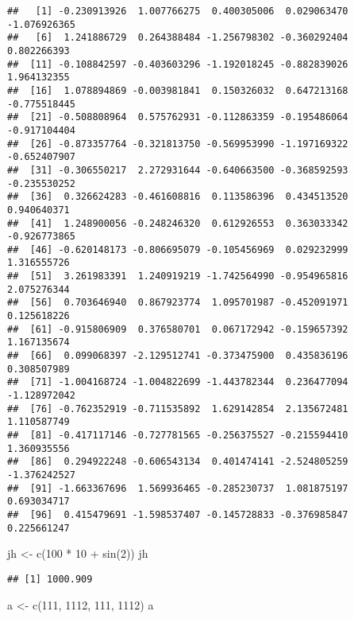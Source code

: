 \documentclass[
]{article}
\newenvironment{Shaded}{\begin{snugshade}}{\end{snugshade}}
\newcommand{\DecValTok}[1]{\textcolor[rgb]{0.00,0.00,0.81}{#1}}
\newcommand{\FunctionTok}[1]{\textcolor[rgb]{0.00,0.00,0.00}{#1}}
\newcommand{\NormalTok}[1]{#1}
\newcommand{\OtherTok}[1]{\textcolor[rgb]{0.56,0.35,0.01}{#1}}
\newcommand{\SpecialCharTok}[1]{\textcolor[rgb]{0.00,0.00,0.00}{#1}}
\begin{document}
\begin{verbatim}
##   [1] -0.230913926  1.007766275  0.400305006  0.029063470 -1.076926365
##   [6]  1.241886729  0.264388484 -1.256798302 -0.360292404  0.802266393
##  [11] -0.108842597 -0.403603296 -1.192018245 -0.882839026  1.964132355
##  [16]  1.078894869 -0.003981841  0.150326032  0.647213168 -0.775518445
##  [21] -0.508808964  0.575762931 -0.112863359 -0.195486064 -0.917104404
##  [26] -0.873357764 -0.321813750 -0.569953990 -1.197169322 -0.652407907
##  [31] -0.306550217  2.272931644 -0.640663500 -0.368592593 -0.235530252
##  [36]  0.326624283 -0.461608816  0.113586396  0.434513520  0.940640371
##  [41]  1.248900056 -0.248246320  0.612926553  0.363033342 -0.926773865
##  [46] -0.620148173 -0.806695079 -0.105456969  0.029232999  1.316555726
##  [51]  3.261983391  1.240919219 -1.742564990 -0.954965816  2.075276344
##  [56]  0.703646940  0.867923774  1.095701987 -0.452091971  0.125618226
##  [61] -0.915806909  0.376580701  0.067172942 -0.159657392  1.167135674
##  [66]  0.099068397 -2.129512741 -0.373475900  0.435836196  0.308507989
##  [71] -1.004168724 -1.004822699 -1.443782344  0.236477094 -1.128972042
##  [76] -0.762352919 -0.711535892  1.629142854  2.135672481  1.110587749
##  [81] -0.417117146 -0.727781565 -0.256375527 -0.215594410  1.360935556
##  [86]  0.294922248 -0.606543134  0.401474141 -2.524805259 -1.376242527
##  [91] -1.663367696  1.569936465 -0.285230737  1.081875197  0.693034717
##  [96]  0.415479691 -1.598537407 -0.145728833 -0.376985847  0.225661247
\end{verbatim}

\begin{Shaded}
\begin{Highlighting}[]
\NormalTok{jh }\OtherTok{\textless{}{-}} \FunctionTok{c}\NormalTok{(}\DecValTok{100} \SpecialCharTok{*} \DecValTok{10} \SpecialCharTok{+} \FunctionTok{sin}\NormalTok{(}\DecValTok{2}\NormalTok{))}
\NormalTok{jh}
\end{Highlighting}
\end{Shaded}

\begin{verbatim}
## [1] 1000.909
\end{verbatim}

\begin{Shaded}
\begin{Highlighting}[]
\NormalTok{a }\OtherTok{\textless{}{-}} \FunctionTok{c}\NormalTok{(}\DecValTok{111}\NormalTok{, }\DecValTok{1112}\NormalTok{, }\DecValTok{111}\NormalTok{, }\DecValTok{1112}\NormalTok{)}
\NormalTok{a}
\end{Highlighting}
\end{Shaded}
\end{document}
